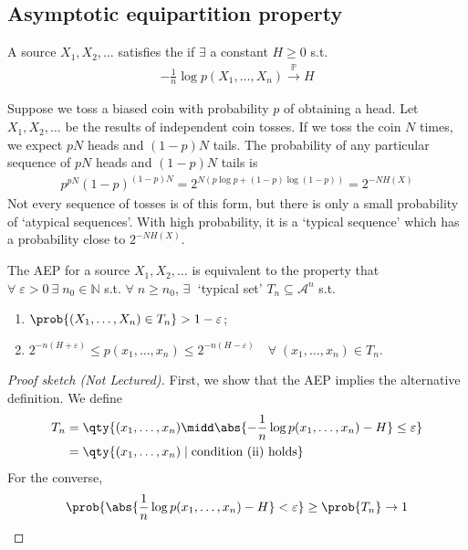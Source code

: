 \subsection{Asymptotic equipartition property}
\begin{definition}
    A source $X_1, X_2, \dots$ satisfies the  if $\exists$ a constant $H \geq 0$ s.t.
    \begin{align*}
        -\frac{1}{n} \log p(X_1, \dots, X_n) \xrightarrow{\mathbb P} H
    \end{align*}
\end{definition}

\begin{example}
    Suppose we toss a biased coin with probability $p$ of obtaining a head.
    Let $X_1, X_2, \dots$ be the results of independent coin tosses.
    If we toss the coin $N$ times, we expect $pN$ heads and $(1-p)N$ tails.
    The probability of any particular sequence of $pN$ heads and $(1-p)N$ tails is
    \begin{align*}
        p^{pN} (1-p)^{(1-p)N} = 2^{N (p \log p + (1-p) \log(1-p))} = 2^{-NH(X)}
    \end{align*}
    Not every sequence of tosses is of this form, but there is only a small probability of `atypical sequences'.
    With high probability, it is a `typical sequence' which has a probability close to $2^{-NH(X)}$.
\end{example}

\begin{lemma}
    The AEP for a source $X_1, X_2, \dots$ is equivalent to the property that $\forall \; \varepsilon > 0 \ \exists \; n_0 \in \mathbb N$ s.t. $\forall \; n \geq n_0$, $\exists \;$ `typical set' $T_n \subseteq \mathcal A^n$ s.t.
    \begin{enumerate}
        \item $\prob{(X_1, \dots, X_n) \in T_n} > 1 - \varepsilon$;
        \item $2^{-n(H+\varepsilon)} \leq p(x_1, \dots, x_n) \leq 2^{-n(H-\varepsilon)} \quad \forall \; (x_1, \dots, x_n) \in T_n$.
    \end{enumerate}
\end{lemma}

\begin{proof}[Proof sketch (Not Lectured)]
    First, we show that the AEP implies the alternative definition.
    We define
    \begin{align*}
        T_n &= \qty{(x_1, \dots, x_n) \midd \abs{-\frac{1}{n} \log p(x_1, \dots, x_n) - H} \leq \varepsilon} \\
        &= \qty{(x_1, \dots, x_n) \mid \text{condition (ii) holds}}
    \end{align*}
    For the converse,
    \begin{align*}
        \prob{\abs{\frac{1}{n}\log p(x_1, \dots, x_n) - H} < \varepsilon} \geq \prob{T_n} \to 1
    \end{align*}
\end{proof}

